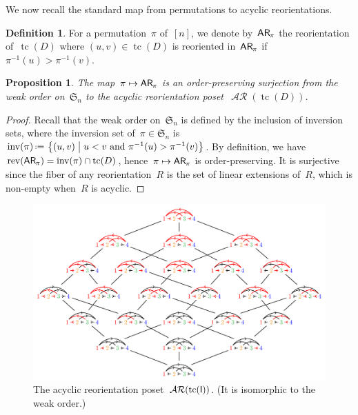 \documentclass{amsart}
\newtheorem{proposition}[theorem]{Proposition}
\theoremstyle{definition}
\newtheorem{definition}[theorem]{Definition}
\renewcommand{\c}[1]{\mathcal{#1}} %
\newcommand{\set}[2]{\left\{ #1 \;\middle|\; #2 \right\}} %
\newcommand{\eqdef}{\mbox{\,\raisebox{0.2ex}{\scriptsize\ensuremath{\mathrm:}}\ensuremath{=}\,}} %
\DeclareMathOperator{\inv}{inv} %
\DeclareMathOperator{\tc}{tc} %
\newcommand{\fS}{\mathfrak{S}} %
\newcommand{\mymap}[2]{\mathsf{#1}_{\hspace{-.7pt}#2}}
\DeclareMathOperator{\AReori}{\c{AR}}  %
\newcommand{\areori}[1]{\mymap{AR}{#1}}  %
\DeclareMathOperator{\rev}{rev} %
\newcommand{\Igraph}{\sf I} %
\begin{document}
We now recall the standard map from permutations to acyclic reorientations.

\begin{definition}
\label{def:Perm2AReori}
For a permutation~$\pi$ of~$[n]$, we denote by~$\areori{\pi}$ the reorientation of~$\tc(D)$ where $(u,v) \in \tc(D)$ is reoriented in~$\areori{\pi}$ if~$\pi^{-1}(u) > \pi^{-1}(v)$.
\end{definition}

\begin{proposition}
\label{prop:Perm2AReori}
The map~$\pi \mapsto \areori{\pi}$ is an order-preserving surjection from the weak order on~$\fS_n$ to the acyclic reorientation poset~$\AReori(\tc(D))$.
\end{proposition}

\begin{proof}
Recall that the weak order on~$\fS_n$ is defined by the inclusion of inversion sets, where the inversion set of~$\pi \in \fS_n$ is~$\inv(\pi) \eqdef \set{(u,v)}{u < v \text{ and } \pi^{-1}(u) > \pi^{-1}(v)}$.
By definition, we have~$\rev(\areori{\pi}) = \inv(\pi) \cap \tc(D)$, hence~$\pi \mapsto \areori{\pi}$ is order-preserving.
It is surjective since the fiber of any reorientation~$R$ is the set of linear extensions of~$R$, which is non-empty when~$R$ is acyclic.
\end{proof}

\begin{figure}
	\centerline{\includegraphics[scale=.68]{acyclicReorientationsI}}
	\caption{The acyclic reorientation poset~$\AReori(\tc(\Igraph))$. (It is isomorphic to the weak order.)}
	\label{fig:acyclicReorientationsI}
\end{figure}
\end{document}
